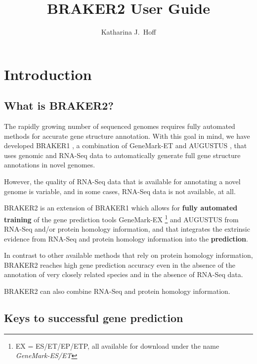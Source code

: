 \documentclass[a4paper,10pt]{report}
\title{BRAKER2 User Guide}
\author{Katharina J.~Hoff}
\begin{document}
\maketitle

\tableofcontents

\chapter{Introduction}

\section{What is BRAKER2?}

The rapidly growing number of sequenced genomes requires fully automated methods for accurate gene structure annotation. With this goal in mind, we have developed BRAKER1 \cite{braker1}, a combination of GeneMark-ET \cite{GeneMark-ET} and AUGUSTUS \cite{AUGUSTUS,stanke2006gene}, that uses genomic and RNA-Seq data to automatically generate full gene structure annotations in novel genomes.

However, the quality of RNA-Seq data that is available for annotating a novel genome is variable, and in some cases, RNA-Seq data is not available, at all.

BRAKER2 is an extension of BRAKER1 which allows for \textbf{fully automated training} of the gene prediction tools GeneMark-EX \cite{AlexandreLomsadze11282005,ter2008gene,GeneMark-ET}\footnote{EX = ES/ET/EP/ETP, all available for download under the name \textit{GeneMark-ES/ET}} and AUGUSTUS from RNA-Seq and/or protein homology information, and that integrates the extrinsic evidence from RNA-Seq and protein homology information into the \textbf{prediction}.

In contrast to other available methods that rely on protein homology information, BRAKER2 reaches high gene prediction accuracy even in the absence of the annotation of very closely related species and in the absence of RNA-Seq data. 

BRAKER2 can also combine RNA-Seq and protein homology information.

\section{Keys to successful gene prediction}
\end{document}
